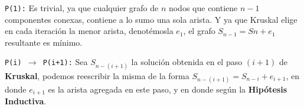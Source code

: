\documentclass[11pt, a4paper, twoside]{article}
\begin{document}
\texttt{P(1):} Es trivial, ya que cualquier grafo de $n$ nodos que contiene
${n-1}$ componentes conexas, contiene a lo sumo una sola arista. 
Y ya que Kruskal elige en cada iteración la menor arista,
denotémosla $e_{1}$, el grafo $S_{n-1} = S{n} + e_{1}$ resultante es mínimo.

\texttt{P(i) $\rightarrow$ P(i+1):}
Sea $S_{n-(i+1)}$ la solución obtenida en el paso $(i+1)$ de \textbf{Kruskal},
podemos reescribir la misma de la forma $S_{n-(i+1)} = S_{n-i} + e_{i+1}$, en
donde $e_{i+1}$ es la arista agregada en este paso, y en donde  según la \textbf{Hipótesis Inductiva}.

\end{document}
